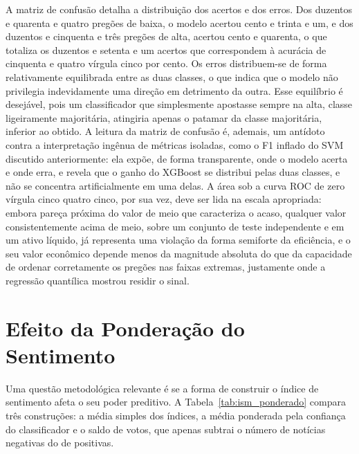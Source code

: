 A matriz de confusão detalha a distribuição dos acertos e dos erros. Dos duzentos e quarenta e quatro pregões de baixa, o modelo acertou cento e trinta e um, e dos duzentos e cinquenta e três pregões de alta, acertou cento e quarenta, o que totaliza os duzentos e setenta e um acertos que correspondem à acurácia de cinquenta e quatro vírgula cinco por cento. Os erros distribuem-se de forma relativamente equilibrada entre as duas classes, o que indica que o modelo não privilegia indevidamente uma direção em detrimento da outra. Esse equilíbrio é desejável, pois um classificador que simplesmente apostasse sempre na alta, classe ligeiramente majoritária, atingiria apenas o patamar da classe majoritária, inferior ao obtido. A leitura da matriz de confusão é, ademais, um antídoto contra a interpretação ingênua de métricas isoladas, como o F1 inflado do SVM discutido anteriormente: ela expõe, de forma transparente, onde o modelo acerta e onde erra, e revela que o ganho do XGBoost se distribui pelas duas classes, e não se concentra artificialmente em uma delas. A área sob a curva ROC de zero vírgula cinco quatro cinco, por sua vez, deve ser lida na escala apropriada: embora pareça próxima do valor de meio que caracteriza o acaso, qualquer valor consistentemente acima de meio, sobre um conjunto de teste independente e em um ativo líquido, já representa uma violação da forma semiforte da eficiência, e o seu valor econômico depende menos da magnitude absoluta do que da capacidade de ordenar corretamente os pregões nas faixas extremas, justamente onde a regressão quantílica mostrou residir o sinal.

\section{Efeito da Ponderação do Sentimento}

Uma questão metodológica relevante é se a forma de construir o índice de sentimento afeta o seu poder preditivo. A Tabela~\ref{tab:ism_ponderado} compara três construções: a média simples dos índices, a média ponderada pela confiança do classificador e o saldo de votos, que apenas subtrai o número de notícias negativas do de positivas.

